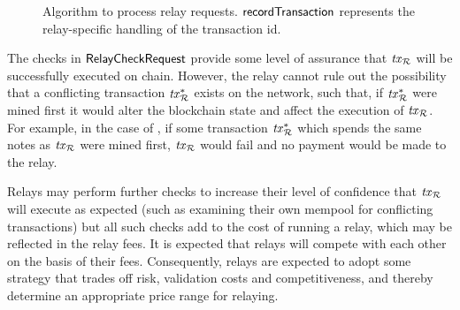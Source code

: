 \begin{figure}[!h]
  \centering
  \caption{Algorithm to process relay requests. $\mathsf{recordTransaction}$ represents the relay-specific handling of the transaction id.}
  \label{relay-proof-permission:fig:relay-handle-request}
\end{figure}

\begin{remark}\label{relay-proof-permission:transaction-failure-cases}
  The checks in $\mathsf{RelayCheckRequest}$ provide some level of assurance that $\mathit{tx}_{\mathcal{R}}$ will be successfully executed on chain. However, the relay cannot rule out the possibility that a conflicting transaction $\mathit{tx}_{\mathcal{R}}^*$ exists on the network, such that, if $\mathit{tx}_{\mathcal{R}}^*$ were mined first it would alter the blockchain state and affect the execution of $\mathit{tx}_{\mathcal{R}}$. For example, in the case of \zeth, if some transaction $\mathit{tx}_{\mathcal{R}}^*$ which spends the same notes as $\mathit{tx}_{\mathcal{R}}$ were mined first, $\mathit{tx}_{\mathcal{R}}$ would fail and no payment would be made to the relay.

Relays may perform further checks to increase their level of confidence that $\mathit{tx}_{\mathcal{R}}$ will execute as expected (such as examining their own mempool for conflicting transactions) but all such checks add to the cost of running a relay, which may be reflected in the relay fees. It is expected that relays will compete with each other on the basis of their fees. Consequently, relays are expected to adopt some strategy that trades off risk, validation costs and competitiveness, and thereby determine an appropriate price range for relaying.
\end{remark}

